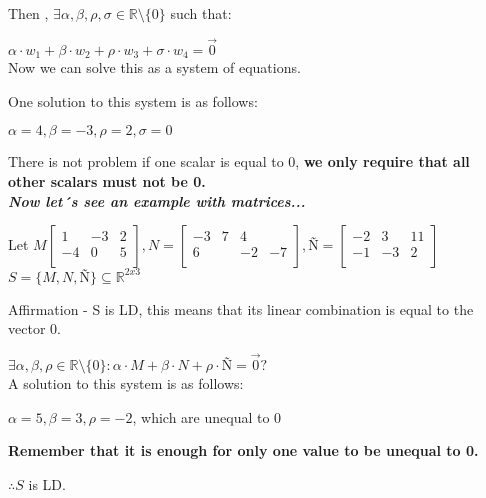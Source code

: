 \documentclass{article}
\begin{document}
Then , \(\exists \alpha, \beta, \rho, \sigma \in \mathbb{R}\text{\textbackslash\{0\}}\) such that:

\(\alpha \cdot w_1 + \beta \cdot w_2 + \rho \cdot w_3 + \sigma \cdot w_4 = \vec{0}\)
\\

Now we can solve this as a system of equations.

One solution to this system is as follows: 

\(\alpha = 4, \beta = -3, \rho = 2, \sigma = 0\)

There is not problem if one scalar is equal to 0, \textbf{we only require that all other scalars must not be 0.}
\\

\textbf{\textit{Now let´s see an example with matrices...}}

Let \(M \begin{bmatrix}
    1&-3&2\\
    -4&0&5\\
\end{bmatrix}, N = \begin{bmatrix}
    -3&7&4\\
    6&&-2&-7\\
\end{bmatrix}, Ñ = \begin{bmatrix}
    -2&3&11\\
    -1&-3&2\\
\end{bmatrix}\)
\\

\(S = \{M,N,Ñ\} \subseteq \mathbb{R}^{2x3}\)

Affirmation - S is LD, this means that its linear combination is equal to the vector 0.

\(\exists \alpha, \beta, \rho \in \mathbb{R} \text{\textbackslash}\{0\} : \alpha \cdot M + \beta \cdot N + \rho \cdot Ñ = \vec{0}?\)
\\

A solution to this system is as follows:

\(\alpha = 5, \beta = 3, \rho =-2\), which are unequal to 0

\textbf{Remember that it is enough for only one value to be unequal to 0.}

\(\therefore S\) is LD.
\end{document}
